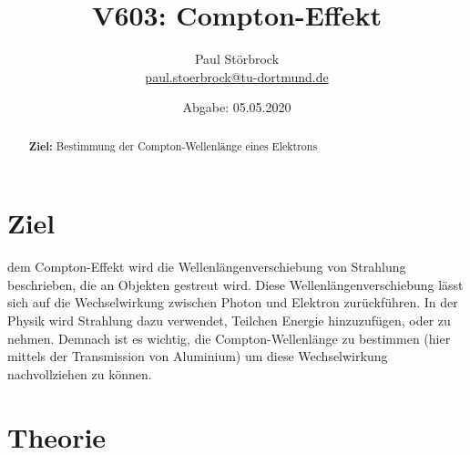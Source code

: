 
\usepackage{tikz}

\newcommand*\circled[1]{\tikz[baseline=(char.base)]{
            \node[shape=circle,draw,inner sep=2pt] (char) {#1};}}


    \title{V603: Compton-Effekt}
    \author{  
    Paul Störbrock\\
    \texorpdfstring{\href{mailto:paul.stoerbrock@tu-dortmund.de}{paul.stoerbrock@tu-dortmund.de}}{}
    }
    \date{Abgabe: 05.05.2020\vspace{-4ex}}
\maketitle
    
    \begin{abstract}
    \centering
        \textbf{Ziel:} Bestimmung der Compton-Wellenlänge eines Elektrons
    \end{abstract}

\newpage
\tableofcontents
\newpage

\setcounter{page}{1}

\section{Ziel}

    \justifying dem Compton-Effekt wird die Wellenlängenverschiebung von Strahlung beschrieben, die an Objekten gestreut wird. Diese Wellenlängenverschiebung
    lässt sich auf die Wechselwirkung zwischen Photon und Elektron zurückführen. In der Physik wird Strahlung dazu verwendet, Teilchen Energie hinzuzufügen, oder 
    zu nehmen. Demnach ist es wichtig, die Compton-Wellenlänge zu bestimmen (hier mittels der Transmission von Aluminium) um diese Wechselwirkung nachvollziehen zu können.

\section{Theorie}

